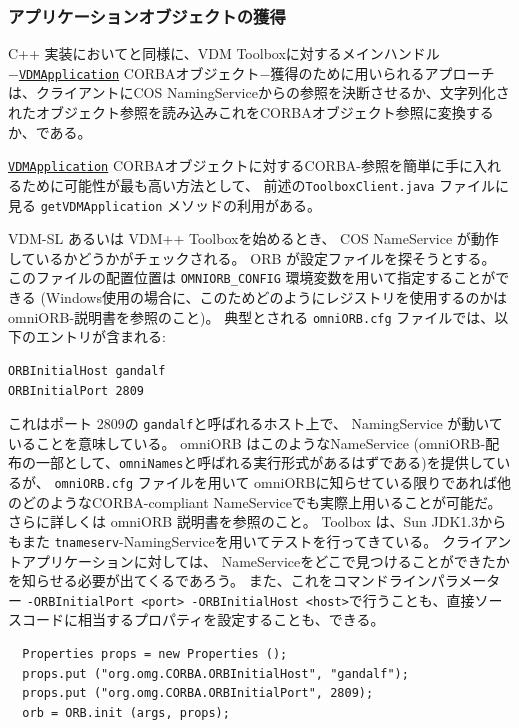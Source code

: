 \documentclass[\pformat,12pt]{jarticle}
\newcommand{\VDMApplication}{\hyperlink{interface.VDMApplication}{VDMApplication}}
\begin{document}

\subsubsection{アプリケーションオブジェクトの獲得}

 C++ 実装においてと同様に、VDM Toolboxに対するメインハンドル−{\tt \VDMApplication} CORBAオブジェクト−獲得のために用いられるアプローチは、クライアントにCOS NamingServiceからの参照を決断させるか、文字列化されたオブジェクト参照を読み込みこれをCORBAオブジェクト参照に変換するか、である。

\texttt{\VDMApplication} CORBAオブジェクトに対するCORBA-参照を簡単に手に入れるために可能性が最も高い方法として、 前述の\texttt{ToolboxClient.java} ファイルに見る {\tt getVDMApplication} メソッドの利用がある。

 VDM-SL あるいは VDM++ Toolboxを始めるとき、 COS NameService が動作しているかどうかがチェックされる。
ORB が設定ファイルを探そうとする。
このファイルの配置位置は {\tt OMNIORB\_CONFIG} 環境変数を用いて指定することができる (Windows使用の場合に、このためどのようにレジストリを使用するのかは omniORB-説明書を参照のこと)。 
典型とされる {\tt omniORB.cfg} ファイルでは、以下のエントリが含まれる:

\begin{verbatim}
ORBInitialHost gandalf
ORBInitialPort 2809
\end{verbatim}

これはポート 2809の {\tt gandalf}と呼ばれるホスト上で、 NamingService が動いていることを意味している。
omniORB はこのようなNameService (omniORB-配布の一部として、\texttt{omniNames}と呼ばれる実行形式があるはずである)を提供しているが、 \texttt{omniORB.cfg} ファイルを用いて omniORBに知らせている限りであれば他のどのようなCORBA-compliant NameServiceでも実際上用いることが可能だ。
さらに詳しくは omniORB 説明書を参照のこと。
Toolbox は、Sun JDK1.3からもまた {\tt tnameserv}-NamingServiceを用いてテストを行ってきている。
クライアントアプリケーションに対しては、 NameServiceをどこで見つけることができたかを知らせる必要が出てくるであろう。
また、これをコマンドラインパラメーター {\tt -ORBInitialPort <port> -ORBInitialHost <host>}で行うことも、直接ソースコードに相当するプロパティを設定することも、できる。

\begin{verbatim}
  Properties props = new Properties ();
  props.put ("org.omg.CORBA.ORBInitialHost", "gandalf");
  props.put ("org.omg.CORBA.ORBInitialPort", 2809);
  orb = ORB.init (args, props);
\end{verbatim}
\end{document}
